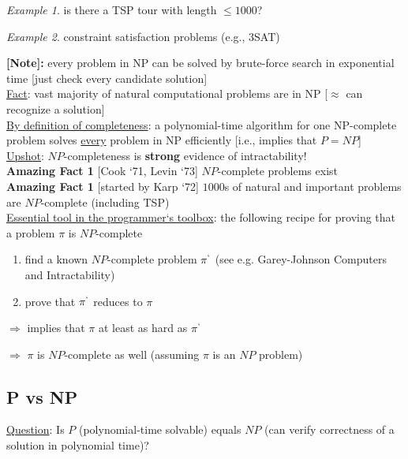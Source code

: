 \documentclass[a4paper,12pt]{article}
\theoremstyle{plain}
\theoremstyle{definition}
\theoremstyle{remark}
\newtheorem*{example}{Example}
\begin{document}
\begin{example} is there a TSP tour with length $\leq 1000$? \end{example}
\begin{example}constraint satisfaction problems (e.g., 3SAT) \end{example}

\textbf{[Note]:} every problem in NP can be solved by brute-force search in exponential time [just check every candidate solution]
\\

\underline{Fact}: vast majority of natural computational problems are in NP [$\approx$ can recognize a solution]
\\

\underline{By definition of completeness}: a polynomial-time algorithm for one NP-complete problem solves \underline{every} problem in NP efficiently [i.e., implies that $P = NP$]
\\

\underline{Upshot}: $NP$-completeness is \textbf{strong} evidence of intractability!
\\

\textbf{Amazing Fact 1} [Cook `71, Levin `73] $NP$-complete problems exist
\\

\textbf{Amazing Fact 1} [started by Karp `72] $1000$s of natural and important problems are $NP$-complete (including TSP)
\\

\underline{Essential tool in the programmer`s toolbox}: the following recipe for proving that a problem $\pi$ is $NP$-complete
\begin{enumerate}
	\item find a known $NP$-complete problem $\pi^`$ (see e.g. Garey-Johnson Computers and Intractability)
	\item prove that $\pi^`$ reduces to $\pi$
\end{enumerate}

$\Rightarrow$ implies that $\pi$ at least as hard as $\pi^`$

$\Rightarrow$ $\pi$ is $NP$-complete as well (assuming $\pi$ is an $NP$ problem)



\subsection{P vs NP}
\underline{Question}: Is $P$ (polynomial-time solvable) equals $NP$ (can verify correctness of a solution in polynomial time)?
\\
\end{document}
